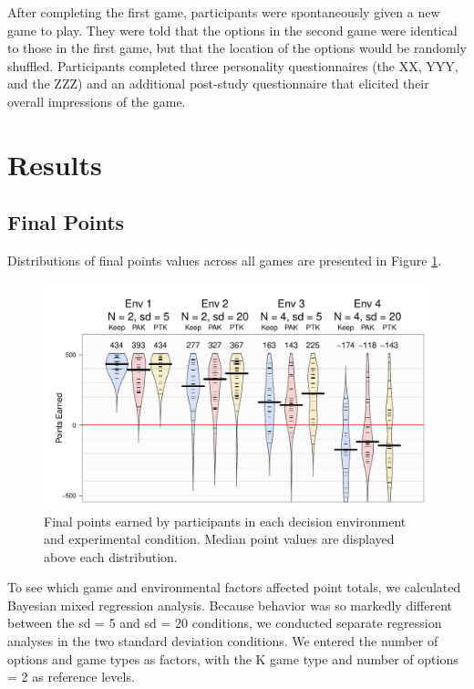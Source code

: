 \documentclass[a4paper,doc,natbib,floatsintext]{apa6}\usepackage[]{graphicx}\usepackage[]{color}
\begin{document}
After completing the first game, participants were spontaneously given a new game to play. They were told that the options in the second game were identical to those in the first game, but that the location of the options would be randomly shuffled. Participants completed three personality questionnaires (the XX, YYY, and the ZZZ) and an additional post-study questionnaire that elicited their overall impressions of the game.

\section{Results}

\subsection{Final Points}

Distributions of final points values across all games are presented in Figure \ref{fig:pointbeans}.




\begin{figure}
\includegraphics[width=\columnwidth]{figures/pointbeans}
\caption{Final points earned by participants in each decision environment and experimental condition. Median point values are displayed above each distribution.}
\label{fig:pointbeans}
\end{figure}

To see which game and environmental factors affected point totals, we calculated Bayesian mixed regression analysis. Because behavior was so markedly different between the sd = 5 and sd = 20 conditions, we conducted separate regression analyses in the two standard deviation conditions. We entered the number of options and game types as factors, with the K game type and number of options = 2 as reference levels.
\end{document}

